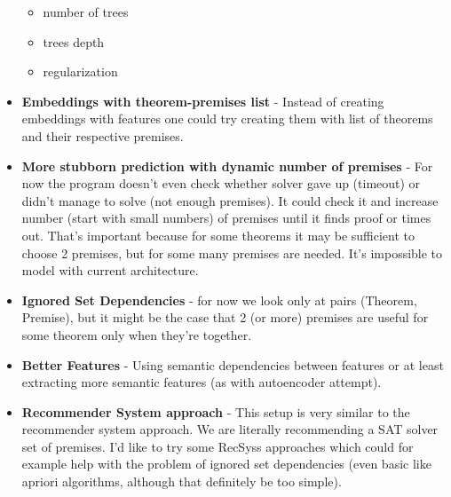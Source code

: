 \documentclass{article} %
\begin{document}
\begin{itemize}
\begin{itemize}
	\item number of trees
	\item trees depth
	\item regularization
	\end{itemize}
\item \textbf{Embeddings with theorem-premises list} - Instead of creating embeddings with features one could try creating them with list of theorems and their respective premises.
\item \textbf{More stubborn prediction with dynamic number of premises} - For now the program doesn't even check whether solver gave up (timeout) or didn't manage to solve (not enough premises). It could check it and increase number (start with small numbers) of premises until it finds proof or times out. That's important because for some theorems it may be sufficient to choose 2 premises, but for some many premises are needed. It's impossible to model with current architecture.
\item \textbf{Ignored Set Dependencies} - for now we look only at pairs (Theorem, Premise), but it might be the case that 2 (or more) premises are useful for some theorem only when they're together.
\item \textbf{Better Features} - Using semantic dependencies between features or at least extracting more semantic features (as with autoencoder attempt).
\item \textbf{Recommender System approach} - This setup is very similar to the recommender system approach. We are literally recommending a SAT solver set of premises. I'd like to try some RecSyss approaches which could for example help with the problem of ignored set dependencies (even basic like apriori algorithms, although that definitely be too simple).

\end{itemize}
\end{document}

